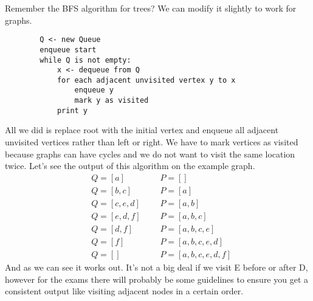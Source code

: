 \documentclass[11pt]{book}
\begin{document}
		\noindent Remember the BFS algorithm for trees? We can modify it slightly
		to work for graphs.
		\begin{verbatim}
		Q <- new Queue
		enqueue start
		while Q is not empty:
		    x <- dequeue from Q
		    for each adjacent unvisited vertex y to x
		        enqueue y
		        mark y as visited
		    print y
		\end{verbatim}
		All we did is replace root with the initial vertex and enqueue all
		adjacent unvisited vertices rather than left or right. We have to mark
		vertices as visited because graphs can have cycles and we do not want
		to visit the same location twice. Let's see the output of this algorithm
		on the example graph.
		\begin{align}
			& Q = [a] & \text{    } & P = [] \\
			& Q = [b,c] & \text{    } & P = [a] \\
			& Q = [c,e,d] & \text{    } & P = [a,b] \\
			& Q = [e,d,f] & \text{    } & P = [a,b,c] \\
			& Q = [d,f] & \text{    } & P = [a,b,c,e] \\
			& Q = [f] & \text{    } & P = [a,b,c,e,d] \\
			& Q = [] & \text{    } & P = [a,b,c,e,d,f]
		\end{align}
		And as we can see it works out. It's not a big deal if we visit E before
		or after D, however for the exams there will probably be some guidelines
		to ensure you get a consistent output like visiting adjacent nodes in a
		certain order.

	\pagebreak
\end{document}

